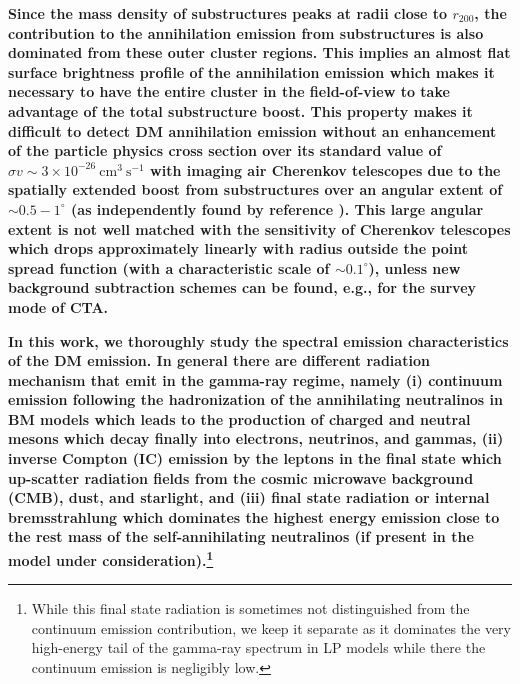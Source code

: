 \documentclass[10pt,aps,pra,reprint,amsmath,amsfonts,amssymb,showpacs,nofootinbib,floatfix]{revtex4-1}
\def\C#1{{\bf #1}}
\newcommand{\degs}{^\circ}
\newcommand{\rvir}{r_{200}}
\begin{document}
\C{Since the mass density of substructures peaks at radii close to
  $\rvir$, the contribution to the annihilation emission from
  substructures is also dominated from these outer cluster regions.
  This implies an almost flat surface brightness profile of the
  annihilation emission which makes it necessary to have the entire
  cluster in the field-of-view to take advantage of the total
  substructure boost. This property makes it difficult to detect DM
  annihilation emission without an enhancement of the particle physics
  cross section over its standard value of $\sigma v\sim 3\times
  10^{-26} ~\mathrm{cm}^3~\mathrm{s}^{-1}$ with imaging air Cherenkov
  telescopes due to the spatially extended boost from substructures
  over an angular extent of $\sim 0.5-1\degs$ (as independently found
  by reference \cite{2011arXiv1104.3530S}). This large angular extent
  is not well matched with the sensitivity of Cherenkov telescopes
  which drops approximately linearly with radius outside the point
  spread function (with a characteristic scale of $\sim 0.1\degs$),
  unless new background subtraction schemes can be found, e.g., for
  the survey mode of CTA.}

\C{In this work, we thoroughly study the spectral emission
  characteristics of the DM emission. In general there are different
  radiation mechanism that emit in the gamma-ray regime, namely (i)
  continuum emission following the hadronization of the annihilating
  neutralinos in BM models which leads to the production of charged
  and neutral mesons which decay finally into electrons, neutrinos,
  and gammas, (ii) inverse Compton (IC) emission by the leptons in the
  final state which up-scatter radiation fields from the cosmic
  microwave background (CMB), dust, and starlight, and (iii) final
  state radiation or internal bremsstrahlung which dominates the
  highest energy emission close to the rest mass of the
  self-annihilating neutralinos (if present in the model under
  consideration).\footnote{While this final state radiation is
    sometimes not distinguished from the continuum emission
    contribution, we keep it separate as it dominates the very
    high-energy tail of the gamma-ray spectrum in LP models while
    there the continuum emission is negligibly low.}}
\end{document}
